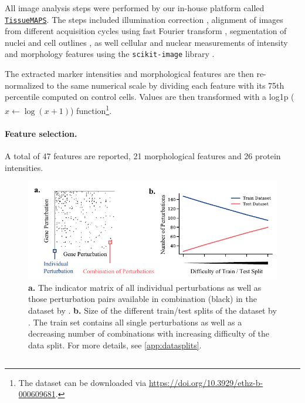 All image analysis steps were performed by our in-house platform called \href{https://github.com/TissueMAPS}{\texttt{TissueMAPS}}. The steps included illumination correction \citep{snijder2012single}, alignment of images from different acquisition cycles using fast Fourier transform \citep{guizar2008efficient}, segmentation of nuclei and cell outlines \citep{stoeger2015computer},  as well cellular and nuclear measurements of intensity and morphology features using the \texttt{scikit-image} library \citep{van2014scikit}.

The extracted marker intensities and morphological features are then re-normalized to the same numerical scale by dividing each feature with its 75th percentile computed on control cells. Values are then transformed with a log1p ($x \xleftarrow{} \log(x + 1)$) function\footnote{\label{fnt:dataset_download} The dataset can be downloaded via \url{https://doi.org/10.3929/ethz-b-000609681}.}.

\paragraph{Feature selection.}
A total of 47 features are reported, 21 morphological features and 26 protein intensities.

\begin{figure}
    \centering
    \includegraphics[width=.9\textwidth]{figures/fig_datasets_splits_processing.pdf}
    \caption{\textbf{a.} The indicator matrix of all individual perturbations as well as those perturbation pairs available in combination (black) in the dataset by \citet{norman2019exploring}. \textbf{b.} Size of the different train/test splits of the dataset by \citet{norman2019exploring}. The train set contains all single perturbations as well as a decreasing number of combinations with increasing difficulty of the data split. For more details, see \cref{app:datasplits}.}
    \label{fig:datasets_processing}
\end{figure}

\subsection{\citet{norman2019exploring}} 
\label{app:dataset_norman}

